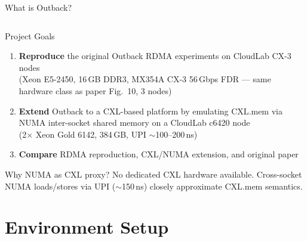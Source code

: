 \documentclass[aspectratio=169]{beamer}
\begin{document}
\begin{frame}{What is Outback?}
\begin{columns}[T]
\end{columns}
\end{frame}

\begin{frame}{Project Goals}
\begin{enumerate}
  \item \textbf{Reproduce} the original Outback RDMA experiments on CloudLab CX-3 nodes\\
        {\small (Xeon E5-2450, 16\,GB DDR3, MX354A CX-3 56\,Gbps FDR --- same hardware class as paper Fig.~10, 3 nodes)}
  \bigskip
  \item \textbf{Extend} Outback to a CXL-based platform by emulating CXL.mem via\\
        NUMA inter-socket shared memory on a CloudLab c6420 node\\
        {\small (2$\times$ Xeon Gold 6142, 384\,GB, UPI $\sim$100--200\,ns)}
  \bigskip
  \item \textbf{Compare} RDMA reproduction, CXL/NUMA extension, and original paper
\end{enumerate}

\vfill
\begin{block}{Why NUMA as CXL proxy?}
No dedicated CXL hardware available. Cross-socket NUMA loads/stores via UPI ($\sim$150\,ns) closely approximate CXL.mem semantics.
\end{block}
\end{frame}

\section{Environment Setup}
\end{document}
